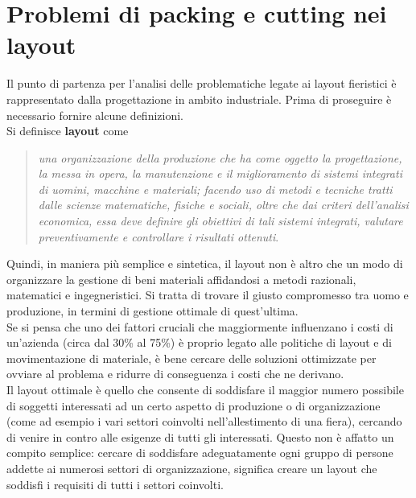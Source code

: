 \documentclass[12pt,a4paper,openright,twoside]{report}
\begin{document}
\newpage
\clearpage{\pagestyle{empty}\cleardoublepage}
\chapter{Problemi di packing e cutting nei layout} 
\lhead[\fancyplain{}{\bfseries\thepage}]{\fancyplain{}{\bfseries\rightmark}}
Il punto di partenza per l'analisi delle problematiche legate ai layout fieristici \`{e} rappresentato dalla progettazione in ambito industriale. Prima di proseguire \`{e} necessario fornire alcune definizioni.\\
Si definisce \textbf{layout} come 
\begin{quotation}
\emph{una organizzazione della produzione che ha come oggetto la progettazione, la
messa in opera, la manutenzione e il miglioramento di sistemi integrati di
uomini, macchine e materiali; facendo uso di metodi e tecniche tratti dalle
scienze matematiche, fisiche e sociali, oltre che dai criteri dell'analisi
economica, essa deve definire gli obiettivi di tali sistemi integrati, valutare
preventivamente e controllare i risultati ottenuti}.
\end{quotation}
Quindi, in maniera pi\`{u} semplice e sintetica, il layout non \`{e} altro che un modo di organizzare la gestione di beni materiali affidandosi a metodi razionali, matematici e ingegneristici. Si tratta di trovare il giusto compromesso tra uomo e produzione, in termini di gestione ottimale di quest'ultima.\\
Se si pensa che uno dei fattori cruciali che maggiormente influenzano i costi di un'azienda (circa dal 30\% al 75\%) \`{e} proprio legato alle politiche di layout e di movimentazione di materiale, \`{e} bene cercare delle soluzioni ottimizzate per ovviare al problema e ridurre di conseguenza i costi che ne derivano.\\
Il layout ottimale \`{e} quello che consente di soddisfare il maggior numero possibile di soggetti interessati ad un certo aspetto di produzione o di organizzazione (come ad esempio i vari settori coinvolti nell'allestimento di una fiera), cercando di venire in contro alle esigenze di tutti gli interessati. Questo non \`{e} affatto un compito semplice: cercare di soddisfare adeguatamente ogni gruppo di persone addette ai numerosi settori di organizzazione, significa creare un layout che soddisfi i requisiti di tutti i settori coinvolti.
\end{document}
